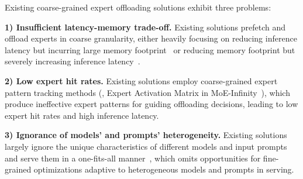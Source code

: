 Existing coarse-grained expert offloading solutions exhibit three problems:

\noindent \textbf{1) Insufficient latency-memory trade-off.} Existing solutions prefetch and offload experts in coarse granularity, either heavily focusing on reducing inference latency but incurring large memory footprint~\cite{xue2024moe} or reducing memory footprint but severely increasing inference latency~\cite{aminabadi2022deepspeed,eliseev2023fast}.

\noindent \textbf{2) Low expert hit rates.} Existing solutions employ coarse-grained expert pattern tracking methods (\eg, Expert Activation Matrix in MoE-Infinity~\cite{xue2024moe}), which produce ineffective expert patterns for guiding offloading decisions, leading to low expert hit rates and high inference latency.

\noindent \textbf{3) Ignorance of \MoE models' and prompts' heterogeneity.} 
Existing solutions largely ignore the unique characteristics of different \MoE models and input prompts and serve them in a one-fits-all manner~\cite{aminabadi2022deepspeed,eliseev2023fast,song2024promoe,xue2024moe}, which omits opportunities for fine-grained optimizations adaptive to heterogeneous models and prompts in \MoE serving.

